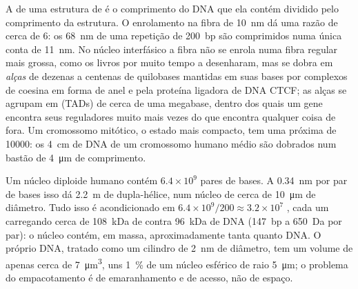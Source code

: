 \begin{proposition}\label{prop:b3:chromatin-epigenetics:compaction}
A \emph{} de uma estrutura de  é o
comprimento do DNA que ela contém dividido pelo comprimento da
estrutura. O enrolamento na fibra de \qty{10}{nm} dá uma razão de
cerca de $6$: os \qty{68}{nm} de uma repetição de \qty{200}{bp} são
comprimidos numa única conta de \qty{11}{nm}. No núcleo interfásico a
fibra não se enrola numa fibra regular mais grossa, como os livros por
muito tempo a desenharam, mas se dobra em \emph{alças} de dezenas a
centenas de quilobases mantidas em suas bases por complexos de coesina
em forma de anel e pela proteína ligadora de DNA CTCF; as alças se
agrupam em \emph{} (TADs) de cerca de
uma megabase, dentro dos quais um gene encontra seus reguladores muito
mais vezes do que encontra qualquer coisa de fora. Um cromossomo
mitótico, o estado mais compacto, tem uma 
próxima de \num{10000}: os \qty{4}{cm} de DNA de um cromossomo humano
médio são dobrados num bastão de \qty{4}{\micro m} de comprimento.
\end{proposition}

\begin{example}\label{ex:b3:chromatin-epigenetics:two-metres}
Um núcleo diploide humano contém $6.4\times 10^{9}$ pares de bases. A
\qty{0.34}{nm} por par de bases isso dá \qty{2.2}{m} de dupla-hélice,
num núcleo de cerca de \qty{10}{\micro m} de diâmetro. Tudo isso é
acondicionado em $6.4\times 10^{9}/200 \approx 3.2\times 10^{7}$
, cada um carregando cerca de \qty{108}{kDa} de 
contra \qty{96}{kDa} de DNA (\qty{147}{bp} a \qty{650}{Da} por par): o
núcleo contém, em massa, aproximadamente tanta  quanto DNA. O
próprio DNA, tratado como um cilindro de \qty{2}{nm} de diâmetro, tem
um volume de apenas cerca de \qty{7}{\micro m^3}, uns \qty{1}{\%} de
um núcleo esférico de raio \qty{5}{\micro m}; o problema do
empacotamento é de emaranhamento e de acesso, não de espaço.
\end{example}

